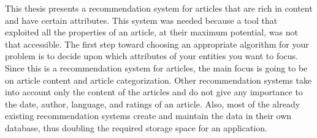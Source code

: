 
This thesis presents a recommendation system for articles that are rich in content and have certain attributes. This system was needed because a tool that exploited all the properties of an article, at their maximum potential, was not that accessible. The first step toward choosing an appropriate algorithm for your problem is to decide upon which attributes of your entities you want to focus. Since this is a recommendation system for articles, the main focus is going to be on article content and article categorization. Other recommendation systems take into account only the content of the articles and do not give any importance to the date, author, language, and ratings of an article. Also, most of the already existing recommendation systems create and maintain the data in their own database, thus doubling the required storage space for an application.
